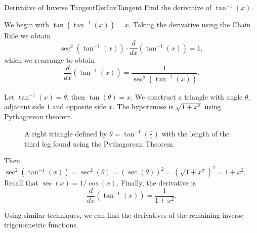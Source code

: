 \begin{example}{Derivative of Inverse Tangent}{DerInvTangent}
Find the derivative of $\tan^{-1}(x)$.
\end{example}
\begin{solution}
We begin with $\tan\left(\tan^{-1}(x)\right)=x$. Taking the derivative using the Chain Rule we obtain
\[\sec^2\left(\tan^{-1}(x)\right)\cdot\frac{d}{dx}\left(\tan^{-1}(x)\right)=1,\]
which we rearrange to obtain
\[\frac{d}{dx}\left(\tan^{-1}(x)\right)=\frac{1}{\sec^2\left(\tan^{-1}(x)\right)}.\]

Let $\tan^{-1}(x)=\theta$, then $\tan(\theta)=x$. We construct a triangle with angle $\theta$, adjacent side $1$ and opposite side $x$. The hypotenuse is $\sqrt{1+x^2}$ using Pythagorean theorem.

 \begin{figure}
 \centering
 
 \caption{\label{fig:inverse3}A right triangle defined by $\theta=\tan ^{-1}(\frac{x}{1})$ with the length of the third leg found using the Pythagorean Theorem.}
 \end{figure}

 Then $\sec^2\left(\tan^{-1}(x)\right)=\sec^2(\theta)=\left(\sec(\theta)\right)^2=\left(\sqrt{1+x^2}\right)^2=1+x^2$. Recall that $\sec(x)=1/\cos(x)$. Finally, the derivative is
\[\frac{d}{dx}\left(\tan^{-1}(x)\right)=\frac{1}{1+x^2}.\]
\end{solution}




Using similar techniques, we can find the derivatives of the remaining inverse trigonometric functions.\\

